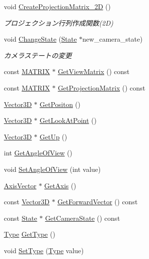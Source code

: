 \begin{DoxyCompactItemize}
void \mbox{\hyperlink{class_camera_aaae8043a952b7675d209bdc9b80bcc3f}{Create\+Projection\+Matrix\+\_\+2D}} ()
\begin{DoxyCompactList}\small\item\em プロジェクション行列作成関数(2\+D) \end{DoxyCompactList}\item 
void \mbox{\hyperlink{class_camera_abb88028a49a71e9a6774d58076816dbf}{Change\+State}} (\mbox{\hyperlink{class_camera_1_1_state}{State}} $\ast$new\+\_\+camera\+\_\+state)
\begin{DoxyCompactList}\small\item\em カメラステートの変更 \end{DoxyCompactList}\item 
const \mbox{\hyperlink{_vector3_d_8h_a032295cd9fb1b711757c90667278e744}{M\+A\+T\+R\+IX}} $\ast$ \mbox{\hyperlink{class_camera_aa472374f61480c5a9dff89d30be029f4}{Get\+View\+Matrix}} () const
\item 
const \mbox{\hyperlink{_vector3_d_8h_a032295cd9fb1b711757c90667278e744}{M\+A\+T\+R\+IX}} $\ast$ \mbox{\hyperlink{class_camera_a473a7a8408bc7a1fdd46d12fa3852846}{Get\+Projection\+Matrix}} () const
\item 
\mbox{\hyperlink{class_vector3_d}{Vector3D}} $\ast$ \mbox{\hyperlink{class_camera_a18f380bd6b2c42162c8fcf7e4441a355}{Get\+Positon}} ()
\item 
\mbox{\hyperlink{class_vector3_d}{Vector3D}} $\ast$ \mbox{\hyperlink{class_camera_a4cc3e87e6522b4a1ae72eab5b87430a6}{Get\+Look\+At\+Point}} ()
\item 
\mbox{\hyperlink{class_vector3_d}{Vector3D}} $\ast$ \mbox{\hyperlink{class_camera_aa767cb71ea435cee1e42effc912904eb}{Get\+Up}} ()
\item 
int \mbox{\hyperlink{class_camera_a9d54f574c141e6007d98ccd905501632}{Get\+Angle\+Of\+View}} ()
\item 
void \mbox{\hyperlink{class_camera_a4c22c8ceed9126db627df9be7eb53a42}{Set\+Angle\+Of\+View}} (int value)
\item 
\mbox{\hyperlink{class_axis_vector}{Axis\+Vector}} $\ast$ \mbox{\hyperlink{class_camera_a62c4371143e87e34c70d27f2728987d9}{Get\+Axis}} ()
\item 
const \mbox{\hyperlink{class_vector3_d}{Vector3D}} $\ast$ \mbox{\hyperlink{class_camera_aec9441c5c1924df0a0cacbcf28c839e2}{Get\+Forward\+Vector}} () const
\item 
const \mbox{\hyperlink{class_camera_1_1_state}{State}} $\ast$ \mbox{\hyperlink{class_camera_a47e72bd04f7aaac1657d7bce5322b97c}{Get\+Camera\+State}} () const
\item 
\mbox{\hyperlink{class_camera_a3b0a1f58deca679ac665f61c480d1dcb}{Type}} \mbox{\hyperlink{class_camera_a3bda45b352bfa163c306c638a2aee1f6}{Get\+Type}} ()
\item 
void \mbox{\hyperlink{class_camera_a6218126e761a8289c6e6bc8c66b05e47}{Set\+Type}} (\mbox{\hyperlink{class_camera_a3b0a1f58deca679ac665f61c480d1dcb}{Type}} value)
\end{DoxyCompactItemize}

